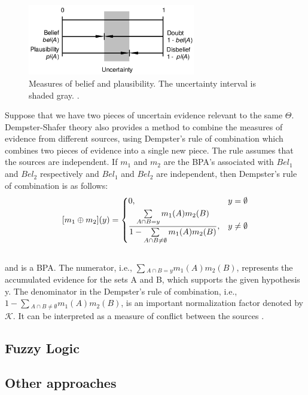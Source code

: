 \documentclass[11pt]{article}
\begin{document}
\begin{figure}[tbh]
  \center
  \includegraphics[width=0.65\textwidth]{figure/uncertainty.png}
  \caption{Measures of belief and plausibility. The uncertainty interval is
  shaded gray. \cite{kay:dst-reliability}.}
  \label{fig:uncertainty}
\end{figure}

Suppose that we have two pieces of uncertain evidence relevant to the same
$\Theta$. Dempster-Shafer theory also provides a method to combine the measures
of evidence from different sources, using Dempster's rule of combination which
combines two pieces of evidence into a single new piece. The rule assumes that
the sources are independent. If $m_1$ and $m_2$ are the BPA's associated with
$Bel_1$ and $Bel_2$ respectively and $Bel_1$ and $Bel_2$ are independent, then
Dempster's rule of combination is as follows:\\

\[
	[m_1 \oplus m_2](y) = 
    \begin{dcases}
      0, & y = \emptyset \\
      \frac{\sum\limits_{A \cap B = y}m_1(A)m_2(B)}{1-\sum\limits_{A
      \cap B \neq \emptyset}m_1(A)m_2(B)}, & y
      \neq
      \emptyset
	\end{dcases}
\]\\

\noindent and is a BPA. The numerator, i.e., $\sum\limits{_{A \cap B
=y}}m_1(A)m_2(B)$, represents the accumulated evidence for the sets A and B,
which supports the given hypothesis y. The denominator in the Dempster's rule of
combination, i.e., $1-\sum\limits{_{A \cap B \neq \emptyset}}m_1(A)m_2(B)$, is
an important normalization factor denoted by $\mathcal{K}$. It can be
interpreted as a measure of conflict between the sources
\cite{srivastava:evidential-reasoning-uncertainty}.

\subsection{Fuzzy Logic}

\subsection{Other approaches}
\end{document}
